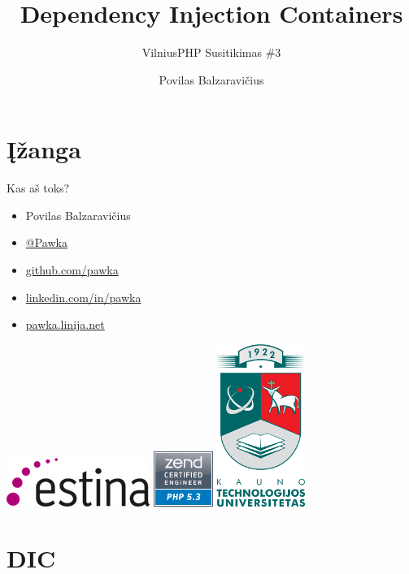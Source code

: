 \documentclass[12pt,a4paper]{beamer}
\author{Povilas Balzaravičius}
\title{Dependency Injection Containers}
\subtitle{VilniusPHP Susitikimas \#3}
\begin{document}
\section{Įžanga}
\begin{frame}
	\titlepage
\end{frame}

\begin{frame}{Kas aš toks?}
    \begin{itemize}
        \item Povilas Balzaravičius
        \item \href{https://twitter.com/pawka}{@Pawka}
        \item \href{https://github.com/pawka}{github.com/pawka}
        \item \href{https://linkedin.com/in/pawka}{linkedin.com/in/pawka}
        \item \href{http://pawka.linija.net}{pawka.linija.net}
    \end{itemize}
    \begin{center}
        \includegraphics[scale=0.4]{img/estina.png}
        \hskip1.5cm
        \includegraphics[scale=0.4]{img/zce.png}
        \hskip1.5cm
        \includegraphics[scale=0.75]{img/ktu.png}
    \end{center}
\end{frame}

\section{DIC}
\end{document}
